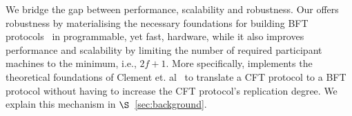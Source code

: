  We bridge the gap between performance, scalability and robustness. Our \projecttitle{} offers robustness by materialising the necessary foundations for building BFT protocols~\cite{clement2012} in programmable, yet fast, hardware, while it also improves performance and scalability by limiting the number of required participant machines to the minimum, i.e., $2f+1$. More specifically, \projecttitle{} implements the theoretical foundations of Clement et. al~\cite{clement2012} to translate a CFT protocol to a BFT protocol without having to increase the CFT protocol's replication degree. We explain this mechanism in $\S$~\ref{sec:background}.  %






